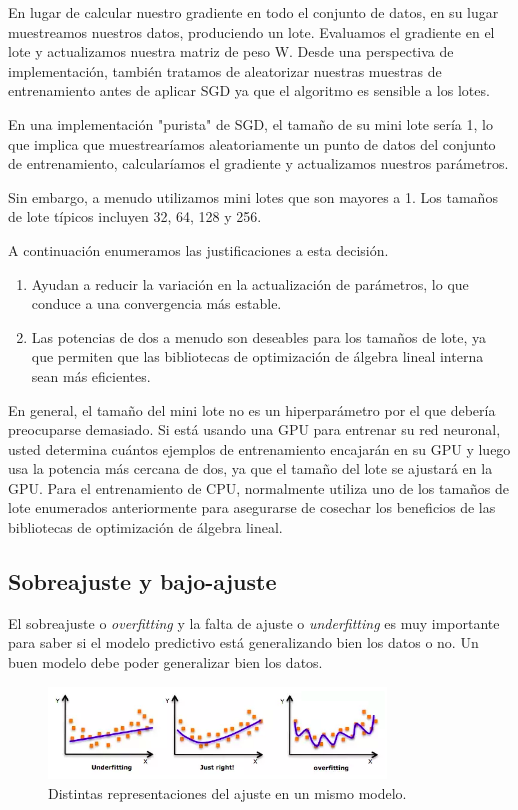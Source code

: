 \documentclass[a4paper,12pt]{article}
\begin{document}
En lugar de calcular nuestro gradiente en todo el conjunto de datos, en su lugar muestreamos nuestros datos, produciendo un lote. Evaluamos el gradiente en el lote y actualizamos nuestra matriz de peso W. Desde una perspectiva de implementación, también tratamos de aleatorizar nuestras muestras de entrenamiento antes de aplicar SGD ya que el algoritmo es sensible a los lotes.

En una implementación "purista" de SGD, el tamaño de su mini lote sería 1, lo que implica que muestrearíamos aleatoriamente un punto de datos del conjunto de entrenamiento, calcularíamos el gradiente
y actualizamos nuestros parámetros.

Sin embargo, a menudo utilizamos mini lotes que son mayores a 1. Los tamaños de lote típicos incluyen 32, 64, 128 y 256.

A continuación enumeramos las justificaciones a esta decisión.

\begin{enumerate}
\item Ayudan a reducir la variación en la actualización de parámetros, lo que conduce a una convergencia más estable. 
\item Las potencias de dos a menudo son deseables para los tamaños de lote, ya que permiten que las bibliotecas de optimización de álgebra lineal interna sean más eficientes.
\end{enumerate}
En general, el tamaño del mini lote no es un hiperparámetro por el que debería preocuparse demasiado. Si está usando una GPU para entrenar su red neuronal, usted determina cuántos ejemplos de entrenamiento encajarán en su GPU y luego usa la potencia más cercana de dos, ya que el tamaño del lote se ajustará en la GPU. Para el entrenamiento de CPU, normalmente utiliza uno de los tamaños de lote enumerados anteriormente para asegurarse de cosechar los beneficios de las bibliotecas de optimización de álgebra lineal.

\subsection{Sobreajuste y bajo-ajuste}
El sobreajuste o \textit{overfitting} y la falta de ajuste o \textit{underfitting} \cite{quora} es muy importante para saber si el modelo predictivo está generalizando bien los datos o no. Un buen modelo debe poder generalizar bien los datos.

\begin{figure}[H]
	\begin{center}				
	\includegraphics[width=0.8\textwidth]{026.png}
  	\caption{Distintas representaciones del ajuste en un mismo modelo.}
  	\label{fig:fitting}
  	\end{center}
\end{figure}
\end{document}
